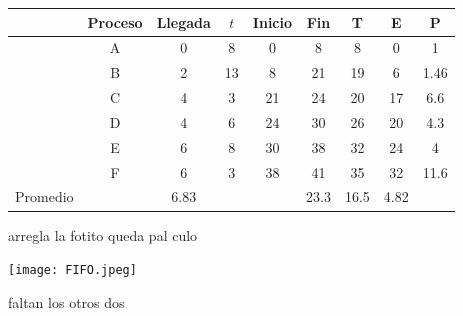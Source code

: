 \documentclass[11pt]{article}
\begin{document}
\begin{tabular}{|c|c|c|c|c|c|c|c|c|}
    \hline
    & Proceso & Llegada & $t$ & Inicio & Fin & T & E & P \\
    \hline
    & A & 0 & 8 & 0 & 8 & 8 & 0 & 1 \\
    \hline
    & B & 2 & 13 & 8 & 21 & 19 & 6 & 1.46 \\
    \hline
    & C & 4 & 3 & 21 & 24 & 20 & 17 & 6.6 \\
    \hline
    & D & 4 & 6 & 24 & 30 & 26 & 20 & 4.3 \\
    \hline
    & E & 6 & 8 & 30 & 38 & 32 & 24 & 4 \\
    \hline
    & F & 6 & 3 & 38 & 41 & 35 & 32 & 11.6 \\ 
    \hline
    Promedio & & 6.83 & & & 23.3 & 16.5 & 4.82 &\\
    \hline
\end{tabular}

arregla la fotito queda pal culo

\texttt{[image: FIFO.jpeg]}

faltan los otros dos 
\end{document}
